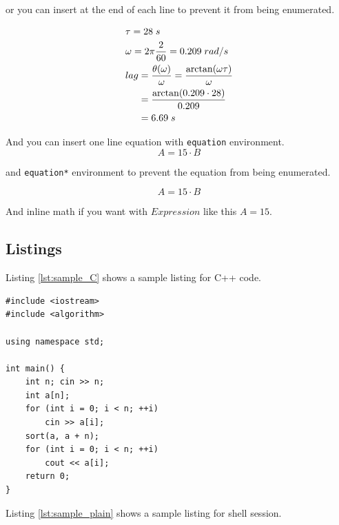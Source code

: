 \documentclass[12pt]{article}
\begin{document}
or you can insert \texttt{\notag} at the end of each line to prevent it from being enumerated.

\begin{align}
    & \tau = 28\;s \notag\\
    & \omega = 2 \pi \frac{2}{60} = 0.209\;rad/s \notag\\
    & \begin{aligned}[t]
                lag &= \frac{\theta (\omega)}{\omega} = \frac{\arctan (\omega \tau)}{\omega} \\
                &= \frac{\arctan (0.209 \cdot 28)}{0.209} \\ 
                &= 6.69\;s
       \end{aligned} \notag
\end{align}

And you can insert one line equation with \texttt{equation} environment.
\begin{equation}
    A = 15 \cdot B
\end{equation}

and \texttt{equation*} environment to prevent the equation from being enumerated.

\begin{equation*}
    A = 15 \cdot B
\end{equation*}

And inline math if you want with \texttt{$Expression$} like this $A = 15$.

\subsection{Listings}
Listing \ref{lst:sample_C} shows a sample listing for C++ code.
\begin{listing}[H]
\begin{verbatim}
#include <iostream>
#include <algorithm>

using namespace std;

int main() {
    int n; cin >> n;
    int a[n];
    for (int i = 0; i < n; ++i)
        cin >> a[i];
    sort(a, a + n);
    for (int i = 0; i < n; ++i)
        cout << a[i];
    return 0;
}
\end{verbatim}
\caption{Sample Code}
\label{lst:sample_C}
\end{listing}

Listing \ref{lst:sample_plain} shows a sample listing for shell session.
\end{document}
